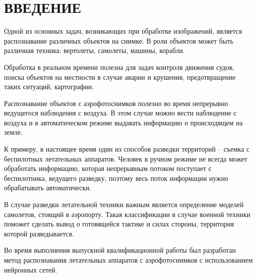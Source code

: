 \chapter*{ВВЕДЕНИЕ}

Одной из основных задач, возникающих при обработке изображений, является распознавание различных объектов на снимке. В роли объектов может быть различная техника: вертолеты, самолеты, машины, корабли.

Обработка в реальном времени полезна для задач контроля движения судов, поиска объектов на местности в случае аварии и крушения, предотвращение таких ситуаций, картографии.

Распознавание объектов с аэрофотоснимков полезно во время непрерывно ведущегося наблюдения с воздуха. В этом случае можно вести наблюдение с воздуха и в автоматическом режиме выдавать информацию о происходящем на земле.

К примеру, в настоящее время один из способов разведки территорий -- съемка с беспилотных летательных аппаратов. Человек в ручном режиме не всегда может обработать информацию, которая непрерывным потоком поступает с беспилотника, ведущего разведку, поэтому весь поток информации нужно обрабатывать автоматически. 

В случае разведки летательной техники важным является определение моделей самолетов, стоящий в аэропорту. Такая классификации в случае военной техники поможет сделать вывод о готовящейся тактике и силах стороны, территория которой разведывается.

Во время выполнения выпускной квалификационной работы был разработан метод распознавания летательных аппаратов с аэрофотоснимков с использованием нейронных сетей.